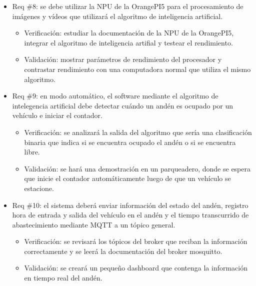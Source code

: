 \documentclass[
11pt, %
]{charter}
\begin{document}
\begin{itemize} 
\item Req \#8: se debe utilizar la NPU de la OrangePI5 para el procesamiento de imágenes y vídeos que utilizará el algoritmo de inteligencia artificial.
\begin{itemize}
		\item Verificación: estudiar la documentación de la NPU de la OrangePI5, integrar el algoritmo de inteligencia artifial y testear el rendimiento. 
		\item Validación: mostrar parámetros de rendimiento del procesador y contrastar rendimiento con una computadora normal que utiliza el mismo algoritmo.  
	\end{itemize}
	
	\end{itemize}

\begin{itemize} 
\item Req \#9: en modo automático, el software mediante el algoritmo de intelegencia artificial debe detectar cuándo un andén es ocupado por un vehículo e iniciar el contador.
\begin{itemize}
		\item Verificación: se analizará la salida del algoritmo que sería una clasificación binaria que indica si se encuentra ocupado el andén o si se encuentra libre.
		\item Validación: se hará una demostración en un parqueadero, donde se espera que inicie el contador automáticamente luego de que un vehículo se estacione.  
	\end{itemize}
	
	\end{itemize}

\begin{itemize} 
\item Req \#10: el sistema deberá enviar información del estado del andén, registro hora de entrada y salida del vehículo en el andén y el tiempo transcurrido de abastecimiento mediante MQTT a un tópico general.
\begin{itemize}
		\item Verificación: se revisará los tópicos del broker que reciban la información correctamente y se leerá la documentación del broker mosquitto.
		\item Validación: se creará un pequeño dashboard que contenga la información en tiempo real del andén.  
	\end{itemize}
	
	\end{itemize}
\end{document}
